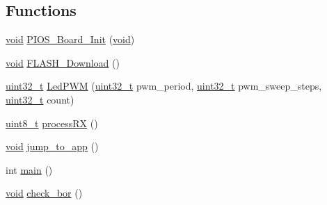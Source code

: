 \subsection*{Functions}
\begin{DoxyCompactItemize}
\item 
\hyperlink{group___n_a_m_e_ga18028b8badbf1ea7e704ccac3c488e82}{void} \hyperlink{group___revolution_b_l_ga902009c5b1cb57d9f9d60092eb7cacfb}{P\-I\-O\-S\-\_\-\-Board\-\_\-\-Init} (\hyperlink{group___n_a_m_e_ga18028b8badbf1ea7e704ccac3c488e82}{void})
\item 
\hyperlink{group___n_a_m_e_ga18028b8badbf1ea7e704ccac3c488e82}{void} \hyperlink{group___revolution_b_l_ga7ec2ca9d0a908d6508dbc58c00eb18ec}{F\-L\-A\-S\-H\-\_\-\-Download} ()
\item 
\hyperlink{stdint_8h_a435d1572bf3f880d55459d9805097f62}{uint32\-\_\-t} \hyperlink{group___revolution_b_l_ga75e30c099232f21fa6e08353b0dfcef7}{Led\-P\-W\-M} (\hyperlink{stdint_8h_a435d1572bf3f880d55459d9805097f62}{uint32\-\_\-t} pwm\-\_\-period, \hyperlink{stdint_8h_a435d1572bf3f880d55459d9805097f62}{uint32\-\_\-t} pwm\-\_\-sweep\-\_\-steps, \hyperlink{stdint_8h_a435d1572bf3f880d55459d9805097f62}{uint32\-\_\-t} count)
\item 
\hyperlink{stdint_8h_aba7bc1797add20fe3efdf37ced1182c5}{uint8\-\_\-t} \hyperlink{group___revolution_b_l_ga37137877683fa8bb290bf36655ca2359}{process\-R\-X} ()
\item 
\hyperlink{group___n_a_m_e_ga18028b8badbf1ea7e704ccac3c488e82}{void} \hyperlink{group___revolution_b_l_ga4b30467c425c173f9ddf827491be666c}{jump\-\_\-to\-\_\-app} ()
\item 
int \hyperlink{group___revolution_b_l_gae66f6b31b5ad750f1fe042a706a4e3d4}{main} ()
\item 
\hyperlink{group___n_a_m_e_ga18028b8badbf1ea7e704ccac3c488e82}{void} \hyperlink{group___revolution_b_l_ga7b0ed4e8687557e464541def703918fe}{check\-\_\-bor} ()
\end{DoxyCompactItemize}
